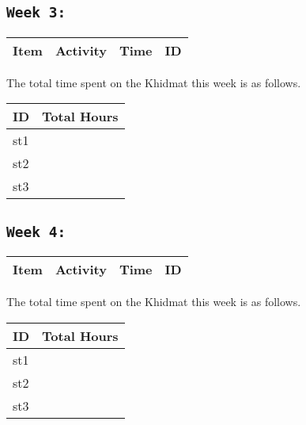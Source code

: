 \documentclass[11pt]{article}
\begin{document}
\subsection{\texttt{Week 3: }}
\begin{center}
\begin{tabular}{|l|l|l|l|}
  \hline
  \textbf{Item} 	& \textbf{Activity} & \textbf{Time} & \textbf{ID} \\\hline
  
\end{tabular}
    
\end{center}
The total time spent on the Khidmat this week is as follows.    
\begin{center}
    
\begin{tabular}{|l|l|}
  \hline
  \textbf{ID} & \textbf{Total Hours}\\\hline
  st1 & \\\hline
  st2 & \\\hline
  st3 & \\\hline
\end{tabular}
\end{center}
\newpage
\subsection{\texttt{Week 4: }}
\begin{center}
\begin{tabular}{|l|l|l|l|}
  \hline
  \textbf{Item} 	& \textbf{Activity} & \textbf{Time} & \textbf{ID} \\\hline
  
\end{tabular}
    
\end{center}
The total time spent on the Khidmat this week is as follows.    
\begin{center}
    
\begin{tabular}{|l|l|}
  \hline
  \textbf{ID} & \textbf{Total Hours}\\\hline
  st1 & \\\hline
  st2 & \\\hline
  st3 & \\\hline
\end{tabular}
\end{center}
\newpage
\end{document}
